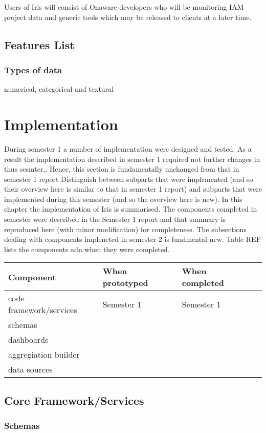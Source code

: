\documentclass[12pt,a4paper,titlepage]{report}
\begin{document}
Users of Iris will consist of Onaware developers who will be monitoring IAM project data and generic tools which may be released to clients at a later time.

\section{Features List}
\subsection{Types of data}
numerical, categorical and textural

\chapter{Implementation}
During semester 1 a number of implementation were designed and tested. As a result the implementation described in
semester 1 required not further changes in thus sesmter,. Hence, this section is fundamentally unchanged from that in
semester 1 report
Distinguish between subparts that were implemented (and so their overview here is similar to that in semester 1 report) and
subparts that were implemented during this semester (and so the overview here is new).
In this chapter the implementation of Iris is summarised. The components completed in semester were described in the
Semester 1 report and that summary is reproduced here (with minor modification) for completeness. The subsections dealing
with components impleneted in semester 2 is fundmental new. Table REF lists the components adn when they were completed.
\begin{center}
\begin{tabular}{llll}
Component                         & When prototyped  & When completed \\\hline
code framework/services  & Semester 1 & Semester 1 \\
schemas &\\
dashboards &\\
aggregiation builder  &\\
data sources & \\
\end{tabular}
\end{center}

\section{Core Framework/Services}
\subsection{Schemas}
\end{document}
